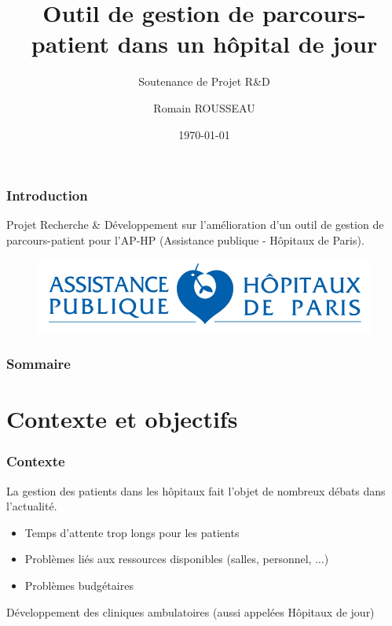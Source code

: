 \documentclass{beamer}
\title[Outil de gestion de parcours-patient]{Outil de gestion de parcours-patient dans un hôpital de jour}
\subtitle{Soutenance de Projet R\&D}
\author{Romain ROUSSEAU}
\date{\today}
\begin{document}
	
\begin{frame}[plain]
	\titlepage
\end{frame}


\begin{frame}[plain]
\frametitle{Introduction}

Projet Recherche \& Développement sur l'amélioration d'un outil de gestion de parcours-patient pour l'AP-HP (Assistance publique - Hôpitaux de Paris).

\begin{figure}
	\includegraphics[scale=0.7]{images/LOGO_APHP}
\end{figure}

\end{frame}


\begin{frame}

\frametitle{Sommaire}

\tableofcontents

\end{frame}


\section[Contexte]{Contexte et objectifs}


\begin{frame}
\frametitle{Contexte}

La gestion des patients dans les hôpitaux fait l'objet de nombreux débats dans l'actualité.

\bigbreak

\begin{itemize}
	\item Temps d'attente trop longs pour les patients
	\item Problèmes liés aux ressources disponibles (salles, personnel, ...) 
	\item Problèmes budgétaires
\end{itemize}

Développement des cliniques ambulatoires (aussi appelées Hôpitaux de jour)

\end{frame}
\end{document}
